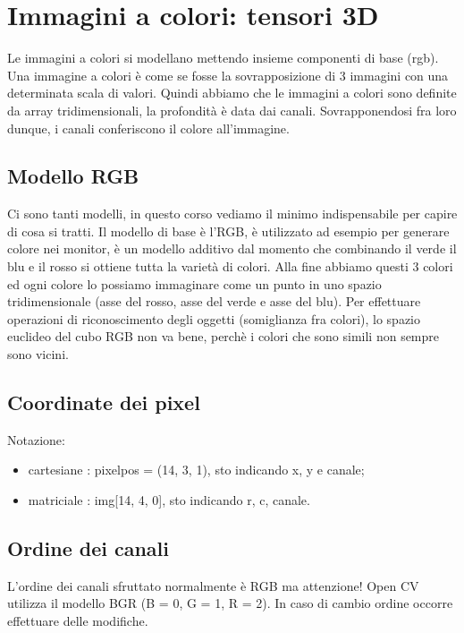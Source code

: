 \section{Immagini a colori: tensori 3D}

Le immagini a colori si modellano mettendo insieme componenti di base (rgb). Una immagine a colori è come se fosse la sovrapposizione di 3 immagini con una determinata scala di valori. Quindi abbiamo che le immagini a colori sono definite da array tridimensionali, la profondità è data dai canali. Sovrapponendosi fra loro dunque, i canali conferiscono il colore all'immagine.

\subsection{Modello RGB}

Ci sono tanti modelli, in questo corso vediamo il minimo indispensabile per capire di cosa si tratti. Il modello di base è l'RGB, è utilizzato ad esempio per generare colore nei monitor, è un modello additivo dal momento che combinando il verde il blu e il rosso si ottiene tutta la varietà di colori. Alla fine abbiamo questi 3 colori ed ogni colore lo possiamo immaginare come un punto in uno spazio tridimensionale (asse del rosso, asse del verde e asse del blu). Per effettuare operazioni di riconoscimento degli oggetti (somiglianza fra colori), lo spazio euclideo del cubo RGB non va bene, perchè i colori che sono simili non sempre sono vicini.

\subsection{Coordinate dei pixel}
Notazione:
\begin{itemize}
	\item cartesiane : pixelpos = (14, 3, 1), sto indicando x, y e canale;
	\item matriciale : img[14, 4, 0], sto indicando r, c, canale.
\end{itemize}

\subsection{Ordine dei canali}

L'ordine dei canali sfruttato normalmente è RGB ma attenzione! Open CV utilizza il modello BGR (B = 0, G = 1, R = 2). In caso di cambio ordine occorre effettuare delle modifiche.

